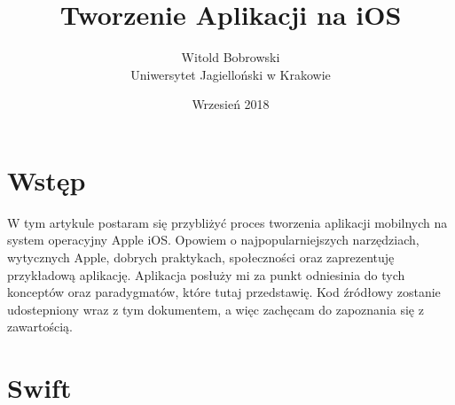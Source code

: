 \documentclass{article}
\title{Tworzenie Aplikacji na iOS}
\author{Witold Bobrowski\\Uniwersytet Jagielloński w Krakowie}
\date{Wrzesień 2018}
\begin{document}
\maketitle

%
%
\section*{Wstęp}
W tym artykule postaram się przybliżyć proces tworzenia aplikacji
mobilnych na system operacyjny Apple iOS\@. Opowiem o najpopularniejszych 
narzędziach, wytycznych Apple, dobrych praktykach, społeczności oraz 
zaprezentuję przykładową aplikację. Aplikacja posłuży mi za punkt odniesinia 
do tych konceptów oraz paradygmatów, które tutaj przedstawię. Kod źródłowy 
zostanie udostepniony wraz z tym dokumentem, a więc zachęcam do zapoznania się 
z zawartością.

%
%
\section*{Swift}
\end{document}
